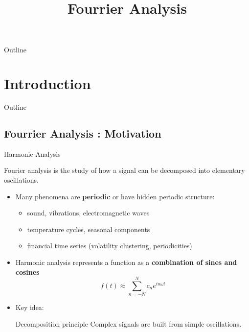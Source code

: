 \documentclass[aspectratio=169]{beamer}
\title{Fourrier Analysis}
\institute{NYU Tandon School, Finance and Risk Engineering}
\begin{document}
\maketitle

\begin{frame}{Outline}
  \tableofcontents[hideallsubsections]
\end{frame}

\section{Introduction}

\begin{frame}{Outline}
\end{frame}

\subsection{Fourrier Analysis : Motivation}

\begin{frame}{Harmonic Analysis}

Fourier analysis is the study of how a signal can be decomposed into elementary oscillations.
\pause
\begin{itemize}
    \item Many phenomena are \textbf{periodic} or have hidden periodic structure:
    \begin{itemize}
        \item sound, vibrations, electromagnetic waves
        \item temperature cycles, seasonal components
        \item financial time series (volatility clustering, periodicities)
    \end{itemize}
\pause
    \item Harmonic analysis represents a function as a \textbf{combination of sines and cosines}
    \[
        f(t) \approx \sum_{n=-N}^{N} c_n e^{i n \omega t}
    \]
\pause
    \item Key idea:
    \begin{block}{Decomposition principle}
      Complex signals are built from simple oscillations.
    \end{block}
\end{itemize}

\end{frame}
\end{document}
